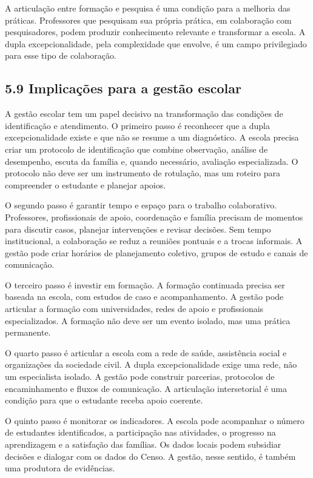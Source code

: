 A articulação entre formação e pesquisa é uma condição para a melhoria
das práticas. Professores que pesquisam sua própria prática, em
colaboração com pesquisadores, podem produzir conhecimento relevante e
transformar a escola. A dupla excepcionalidade, pela complexidade que
envolve, é um campo privilegiado para esse tipo de colaboração.

\subsection{5.9 Implicações para a gestão
escolar}\label{implicauxe7uxf5es-para-a-gestuxe3o-escolar}

A gestão escolar tem um papel decisivo na transformação das condições de
identificação e atendimento. O primeiro passo é reconhecer que a dupla
excepcionalidade existe e que não se resume a um diagnóstico. A escola
precisa criar um protocolo de identificação que combine observação,
análise de desempenho, escuta da família e, quando necessário, avaliação
especializada. O protocolo não deve ser um instrumento de rotulação, mas
um roteiro para compreender o estudante e planejar apoios.

O segundo passo é garantir tempo e espaço para o trabalho colaborativo.
Professores, profissionais de apoio, coordenação e família precisam de
momentos para discutir casos, planejar intervenções e revisar decisões.
Sem tempo institucional, a colaboração se reduz a reuniões pontuais e a
trocas informais. A gestão pode criar horários de planejamento coletivo,
grupos de estudo e canais de comunicação.

O terceiro passo é investir em formação. A formação continuada precisa
ser baseada na escola, com estudos de caso e acompanhamento. A gestão
pode articular a formação com universidades, redes de apoio e
profissionais especializados. A formação não deve ser um evento isolado,
mas uma prática permanente.

O quarto passo é articular a escola com a rede de saúde, assistência
social e organizações da sociedade civil. A dupla excepcionalidade exige
uma rede, não um especialista isolado. A gestão pode construir
parcerias, protocolos de encaminhamento e fluxos de comunicação. A
articulação intersetorial é uma condição para que o estudante receba
apoio coerente.

O quinto passo é monitorar os indicadores. A escola pode acompanhar o
número de estudantes identificados, a participação nas atividades, o
progresso na aprendizagem e a satisfação das famílias. Os dados locais
podem subsidiar decisões e dialogar com os dados do Censo. A gestão,
nesse sentido, é também uma produtora de evidências.

